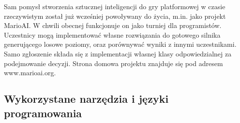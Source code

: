 \begin{par}
	Sam pomysł stworzenia sztucznej inteligencji do gry platformowej w czasie rzeczywistym został już wcześniej powoływany do życia, m.in. jako projekt MarioAI. 
	W chwili obecnej funkcjonuje on jako turniej dla programistów. 
	Uczestnicy mogą implementować własne rozwiązania do gotowego silnika generującego losowe poziomy, oraz porównywać wyniki z innymi uczestnikami.
	Samo zgłoszenie składa się z implementacji własnej klasy odpowiedzialnej za podejmowanie decyzji.
	Strona domowa projektu znajduje się pod adresem www.marioai.org.
\end{par}

\subsection{Wykorzystane narzędzia i języki programowania}
